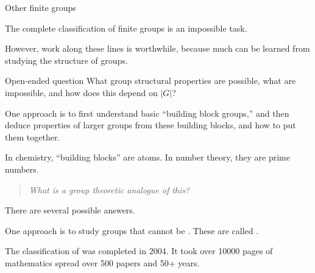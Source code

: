 \documentclass[8pt, handout]{beamer}
\newcommand{\Pause}{}
\begin{document}
\begin{frame}{Other finite groups} 
  
  The complete classification of finite groups is an impossible
  task. \medskip\Pause
  
  However, work along these lines is worthwhile, because much can be
  learned from studying the structure of groups. \medskip\Pause
  
  \begin{exampleblock}{Open-ended question}
    What group structural properties are possible, what are
    impossible, and how does this depend on $|G|$?
  \end{exampleblock}
  
  \smallskip\Pause
  
  One approach is to first understand basic ``building block groups,''
  and then deduce properties of larger groups from these building
  blocks, and how to put them together.
  
  \medskip\Pause
  
  In chemistry, ``building blocks'' are atoms. In number theory, they
  are prime numbers. 
  
  \medskip\Pause

  \begin{quote}
  \emph{What is a group theoretic analogue of this?}
  \end{quote}
  
  \medskip\Pause

  There are several possible answers.

  \medskip\Pause

  One approach is to study groups that cannot be . \Pause These are called . 

  \medskip\Pause
  
  The classification of  was completed in
  2004. It took over 10000 pages of mathematics spread over 500
  papers and 50+ years.

  
\end{frame}

\end{document}
